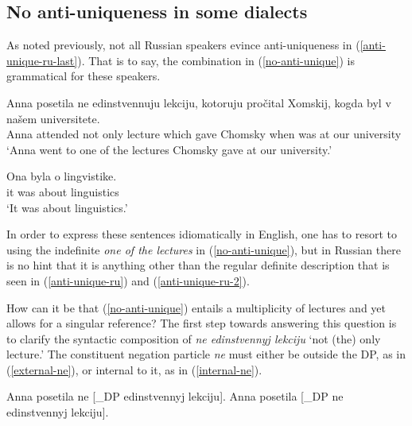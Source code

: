 \documentclass{article}
\begin{document}
\subsection{No anti-uniqueness in some dialects \label{sec:no-anti-unique}}
As noted previously, not all Russian speakers evince anti-uniqueness in (\ref{anti-unique-ru-last}). That is to say, the combination in (\ref{no-anti-unique}) is grammatical for these speakers.

\begin{exe}
	\ex \label{no-anti-unique} \begin{xlist}
		\ex \gll Anna posetila ne edinstvennuju lekciju, kotoruju pro\v{c}ital Xomskij, kogda byl v na\v{s}em universitete.\\
		Anna attended not only lecture which gave Chomsky when was at our university\\
		\glt `Anna went to one of the lectures Chomsky gave at our university.'
		
		\ex \gll Ona byla o lingvistike.\\
		it was about linguistics\\
		\glt `It was about linguistics.'
	\end{xlist}
\end{exe}

In order to express these sentences idiomatically in English, one has to resort to using the indefinite \textit{one of the lectures} in (\ref{no-anti-unique}), but in Russian there is no hint that it is anything other than the regular definite description that is seen in (\ref{anti-unique-ru}) and (\ref{anti-unique-ru-2}).


How can it be that (\ref{no-anti-unique}) entails a multiplicity of lectures and yet allows for a singular reference? The first step towards answering this question is to clarify the syntactic composition of \textit{ne edinstvennyj lekciju} `not (the) only lecture.' The constituent negation particle \textit{ne} must either be outside the DP, as in (\ref{external-ne}), or internal to it, as in (\ref{internal-ne}).

\begin{exe}
	\ex \label{external-ne} Anna posetila ne [_{DP} edinstvennyj lekciju].
	\ex \label{internal-ne} Anna posetila [_{DP} ne edinstvennyj lekciju].
\end{exe}

\end{document}
